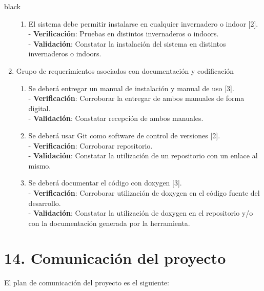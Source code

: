 \documentclass[11pt]{charter}
\begin{document}
\begin{consigna}{black}
\begin{enumerate}
\begin{enumerate}
	\item El sistema debe permitir instalarse en cualquier invernadero o indoor [2].
	\\ - \textbf{Verificación}: Pruebas en distintos invernaderos o indoors.
	\\ - \textbf{Validación}: Constatar la instalación del sistema en distintos invernaderos o indoors.
	
	\end{enumerate}
\item Grupo de requerimientos asociados con documentación y codificación
	\begin{enumerate}
	\item Se deberá entregar un manual de instalación y manual de uso [3].
	\\ - \textbf{Verificación}: Corroborar la entregar de ambos manuales de forma digital.
	\\ - \textbf{Validación}: Constatar recepción de ambos manuales.
	
	\item Se deberá usar Git como software de control de versiones [2].
	\\ - \textbf{Verificación}: Corroborar repositorio.
	\\ - \textbf{Validación}: Constatar la utilización de un repositorio con un enlace al mismo.
	
	\item Se deberá documentar el código con doxygen [3].
	\\ - \textbf{Verificación}: Corroborar utilización de doxygen en el código fuente del desarrollo.
	\\ - \textbf{Validación}: Constatar la utilización de doxygen en el repositorio y/o con la documentación generada por la herramienta.
	
	
	\end{enumerate}


\end{enumerate}

\end{consigna}

\section{14. Comunicación del proyecto}
\label{sec:comunicaciones}

El plan de comunicación del proyecto es el siguiente:
\end{document}
